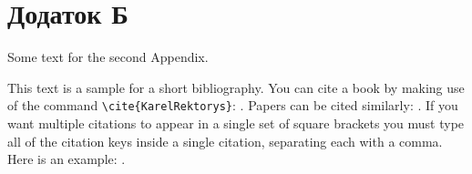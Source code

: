 \chapter{Додаток Б}

Some text for the second Appendix.

This text is a sample for a short bibliography. You can cite a
book by making use of the command \verb"\cite{KarelRektorys}":
\cite{KarelRektorys}. Papers can be cited similarly:
\cite{Bertoti97}. If you want multiple citations to appear in a
single set of square brackets you must type all of the citation
keys inside a single citation, separating each with a comma. Here
is an example: \cite{Bertoti97, Szeidl2001, Carlson67}.
